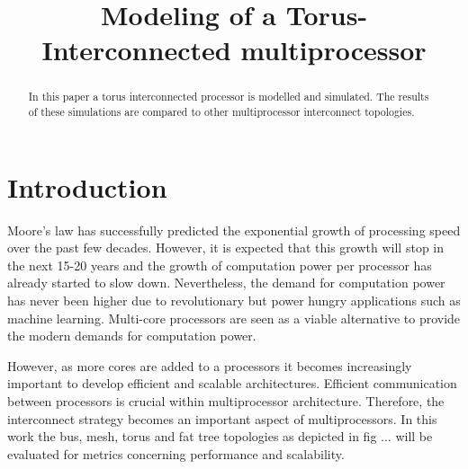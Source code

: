 \documentclass[journal,10pt,twoside, a4paper]{IEEEtran}
\begin{document}
\title{Modeling of a Torus-Interconnected multiprocessor}

\author{ 

}
\maketitle

\begin{abstract}
    In this paper a torus interconnected processor is modelled and simulated. The results of these simulations are compared to other multiprocessor interconnect topologies.
\end{abstract}
\section{Introduction}


Moore's law has successfully predicted the exponential growth of processing speed over the past few decades. However, it is expected that this growth will stop in the next 15-20 years and the growth of computation power per processor has already started to slow down. Nevertheless, the demand for computation power has never been higher due to revolutionary but power hungry applications such as machine learning. Multi-core processors are seen as a viable alternative to provide the modern demands for computation power.  

 However, as more cores are added to a processors it becomes increasingly important to develop efficient and scalable architectures.  Efficient communication between processors is crucial within multiprocessor architecture. Therefore, the interconnect strategy becomes an important aspect of multiprocessors. In this work the bus, mesh, torus and fat tree topologies as depicted in fig ... will be evaluated for metrics concerning performance and scalability.  
 
\end{document}
